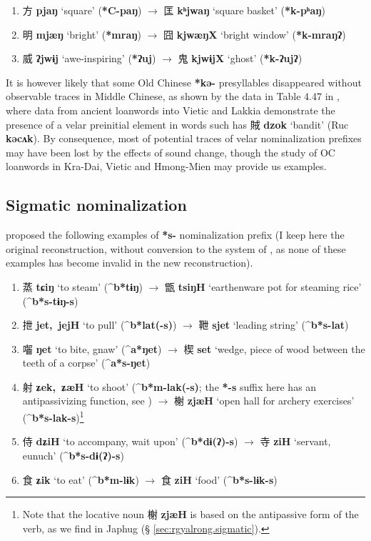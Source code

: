 \documentclass[oneside,a4paper,11pt]{article}
\newcommand{\ipa}[1]{\textbf{{\phon\mbox{#1}}}} %
\newcommand{\zh}[1]{{\cn #1}}
\newcommand{\zhc}[2]{\zh{#1} \ipa{#2}}
\begin{document}
\begin{enumerate}
\item \zhc{方}{pjaŋ} ‘square’ (\ipa{*C-paŋ})  $\rightarrow$ \zhc{匡}{kʰjwaŋ} ‘square basket’   (\ipa{*k-pʰaŋ})
\item \zhc{明}{mjæŋ} ‘bright’ (\ipa{*mraŋ})  $\rightarrow$ \zhc{囧}{kjwæŋX} ‘bright window’   (\ipa{*k-mraŋʔ})
\item \zhc{威}{ʔjwɨj} ‘awe-inspiring’ (\ipa{*ʔuj})  $\rightarrow$ \zhc{鬼}{kjwɨjX} ‘ghost’   (\ipa{*k-ʔujʔ})
\end{enumerate}

It is however likely that some Old Chinese \ipa{*kə-} presyllables disappeared without observable traces in Middle Chinese, as shown by the data in Table 4.47 in \citet[153]{bs14oc}, where data from ancient loanwords into Vietic and Lakkia demonstrate the presence of a velar preinitial element in words such has \zhc{賊}{dzok} `bandit' (Ruc \ipa{kəcʌk}). By consequence, most of potential traces of velar nominalization prefixes may have been lost by the effects of sound change, though the study of OC loanwords in Kra-Dai, Vietic and Hmong-Mien may provide us examples.

\subsection{Sigmatic nominalization}
\citet[73]{sagart99roc} proposed the following examples of \ipa{*s-} nominalization prefix (I keep here the original reconstruction, without conversion to the system of \citealt{bs14oc}, as none of these examples has become invalid in the new reconstruction).

\begin{enumerate}
\item \zhc{蒸}{tɕiŋ} `to steam' (\ipa{^b*tɨŋ}) $\rightarrow$ \zhc{甑}{tsiŋH} `earthenware pot for steaming rice' (\ipa{^b*s-tɨŋ-s})
\item \zhc{抴}{jet, jejH} `to pull' (\ipa{^b*lat(-s)}) $\rightarrow$ \zhc{靾}{sjet} `leading string' (\ipa{^b*s-lat})
\item \zhc{囓}{ŋet} `to bite, gnaw' (\ipa{^a*ŋet}) $\rightarrow$ \zhc{楔}{set} `wedge, piece of wood between the teeth of a corpse' (\ipa{^a*s-ŋet})
\item \zhc{射}{ʑek, ʑæH} `to shoot' (\ipa{^b*m-lak(-s)}; the \ipa{*-s} suffix here has an antipassivizing function, see \citealt{jacques18antipass}) $\rightarrow$ \zhc{榭}{zjæH} `open hall for archery exercises' (\ipa{^b*s-lak-s})\footnote{
Note that the locative noun \zhc{榭}{zjæH} is based on the antipassive form of the verb, as we find in Japhug (§ \ref{sec:rgyalrong.sigmatic}). }
\item \zhc{侍}{dʑiH} `to accompany, wait upon' (\ipa{^b*dɨ(ʔ)-s}) $\rightarrow$ \zhc{寺}{ziH} `servant, eunuch' (\ipa{^b*s-dɨ(ʔ)-s})
\item \zhc{食}{ʑik} `to eat' (\ipa{^b*m-lɨk}) $\rightarrow$ \zhc{食}{ziH} `food' (\ipa{^b*s-lɨk-s})
\end{enumerate}
\end{document}
